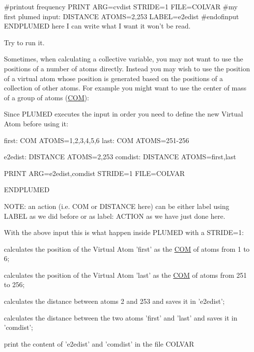 \begin{DoxyVerb}#printout frequency
PRINT ARG=cvdist STRIDE=1 FILE=COLVAR 
#my first plumed input:
DISTANCE ATOMS=2,253 LABEL=e2edist
#endofinput 
ENDPLUMED
here I can write what I want it won't be read.
\end{DoxyVerb}


Try to run it.

Sometimes, when calculating a collective variable, you may not want to use the positions of a number of atoms directly. Instead you may wish to use the position of a virtual atom whose position is generated based on the positions of a collection of other atoms. For example you might want to use the center of mass of a group of atoms (\hyperlink{COM}{C\+O\+M})\+:

Since P\+L\+U\+M\+E\+D executes the input in order you need to define the new Virtual Atom before using it\+:

\begin{DoxyVerb}first: COM ATOMS=1,2,3,4,5,6
last: COM ATOMS=251-256

e2edist: DISTANCE ATOMS=2,253
comdist: DISTANCE ATOMS=first,last

PRINT ARG=e2edist,comdist STRIDE=1 FILE=COLVAR 

ENDPLUMED
\end{DoxyVerb}


N\+O\+T\+E\+: an action (i.\+e. C\+O\+M or D\+I\+S\+T\+A\+N\+C\+E here) can be either label using L\+A\+B\+E\+L as we did before or as label\+: A\+C\+T\+I\+O\+N as we have just done here.

With the above input this is what happen inside P\+L\+U\+M\+E\+D with a S\+T\+R\+I\+D\+E=1\+:


\begin{DoxyEnumerate}
\item calculates the position of the Virtual Atom 'first' as the \hyperlink{COM}{C\+O\+M} of atoms from 1 to 6;
\item calculates the position of the Virtual Atom 'last' as the \hyperlink{COM}{C\+O\+M} of atoms from 251 to 256;
\item calculates the distance between atoms 2 and 253 and saves it in 'e2edist';
\item calculates the distance between the two atoms 'first' and 'last' and saves it in 'comdist';
\item print the content of 'e2edist' and 'comdist' in the file C\+O\+L\+V\+A\+R
\end{DoxyEnumerate}

